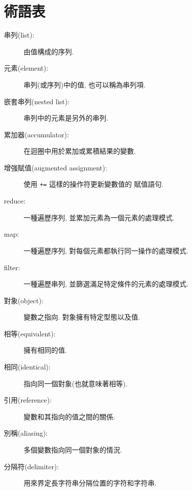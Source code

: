 \documentclass[10pt]{book}
\begin{document}
\section{術語表}

\begin{description}

\item[串列(list):] 由值構成的序列. 

\item[元素(element):] 串列(或序列)中的值, 也可以稱為串列項.

\item[嵌套串列(nested list):] 串列中的元素是另外的串列. 

\item[累加器(accumulator):] 在迴圈中用於累加或累積結果的變數.

\item[增強賦值(augmented assignment):] 使用 \verb"+=" 這樣的操作符更新變數值的
賦值語句.

\item[reduce:] 一種遍歷序列, 並累加元素為一個元素的處理模式.

\item[map:] 一種遍歷序列, 對每個元素都執行同一操作的處理模式.

\item[filter:] 一種遍歷串列, 並篩選滿足特定條件的元素的處理模式.

\item[對象(object):] 變數之指向. 對象擁有特定型態以及值.

\item[相等(equivalent):] 擁有相同的值.

\item[相同(identical):] 指向同一個對象(也就意味著相等).

\item[引用(reference):] 變數和其指向的值之間的關係.

\item[別稱(aliasing):] 多個變數指向同一個對象的情況.

\item[分隔符(delimiter):] 用來界定長字符串分隔位置的字符和字符串.

\end{description}
\end{document}
